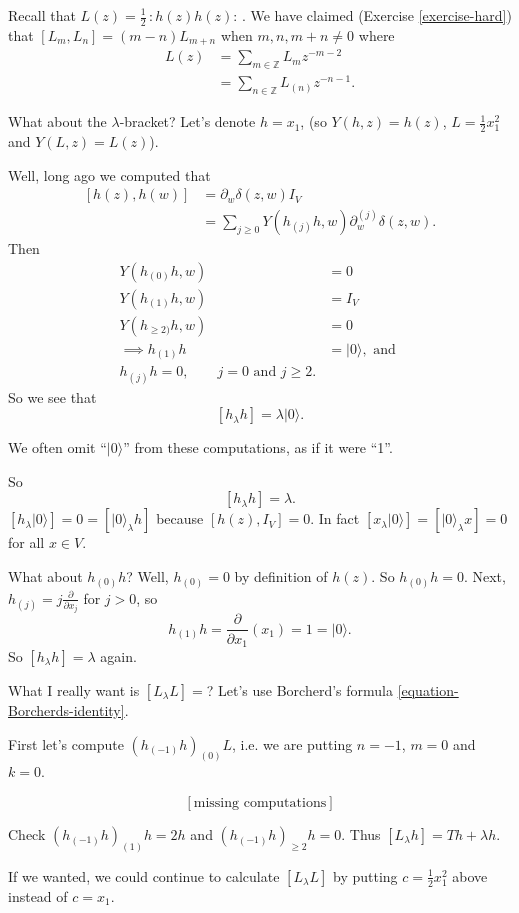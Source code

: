 \begin{example}
Recall that $L(z)=\frac{1}{2}
\,:\!h(z)h(z)\!:\,$. We have claimed
(Exercise \ref{exercise-hard})
that $[L_m,L_n]=(m-n)L_{m+n}$ when $m,n,m+n
\neq 0$
where
$$
\begin{aligned}
L(z)&=\sum_{m \in \mathbb{Z}}L_mz^{-m-2}\\
&=\sum_{n \in \mathbb{Z}}L_{(n)}z^{-n-1}.
\end{aligned}
$$

\medskip\noindent
What about the $\lambda$-bracket? Let's
denote
$h=x_1$, (so $Y(h,z)=h(z)$,
$L=\frac{1}{2}x_1^2$
and $Y(L,z)=L(z)$).

Well, long ago we computed that
$$
\begin{aligned}
[h(z),h(w)]&=\partial_w \delta(z,w)I_V\\
&=\sum_{j \geq
0}Y(h_{(j)}h,w)\partial_w^{(j)}\delta(z,w).
\end{aligned}
$$
Then
$$
\begin{aligned}
Y(h_{(0)}h,w)&=0\\
Y(h_{(1)}h,w)&=I_V\\
Y(h_{\geq 2)}h,w)&=0\\
\implies h_{(1)}h&=|0\rangle, \text{ and }\\
h_{(j)}h=0,\qquad j=0\text{ and }j\geq 2.
\end{aligned}
$$
So we see that
$$
[h_\lambda h]=\lambda |0\rangle.
$$

We often omit  ``$|0\rangle$'' from these
computations,
as if it were ``1''.

So
$$
[h_\lambda h]=\lambda.
$$
\medskip\noindent
$[h_\lambda |0\rangle]=0=[|0\rangle_\lambda
h]$
because $[h(z),I_V]=0$.
In fact $[x_\lambda
|0\rangle]=[|0\rangle_\lambda x]=0$ for all
$x \in V$.

\medskip\noindent
What about $h_{(0)}h$? Well, $h_{(0)}=0$ by
definition of $h(z)$.
So $h_{(0)}h=0$. Next,
$h_{(j)}=j\frac{\partial }{\partial x_j}$ for
$j>0$, so
$$
h_{(1)}h= \frac{\partial }{\partial
x_1}(x_1)=1=|0\rangle.
$$
So $[h_\lambda h]=\lambda$ again.

What I really want is $[L_\lambda L]=$? Let's
use
Borcherd's formula
\ref{equation-Borcherds-identity}.

First let's compute $(h_{(-1)}h)_{(0)}L$,
i.e. we
are putting $n=-1$, $m=0$ and $k=0$.

$$
[\text{missing computations}]
$$
\begin{exercise}
\label{exercise-conta}
Check $(h_{(-1)}h)_{(1)}h=2h$ and
$(h_{(-1)}h)_{\geq 2}h=0$.
Thus $[L_\lambda h]=Th+\lambda h$.
\end{exercise}
If we wanted, we could continue to calculate
$[L_\lambda L]$ by putting
$c=\frac{1}{2}x_1^2$ above
instead of $c=x_1$.


\end{example}
